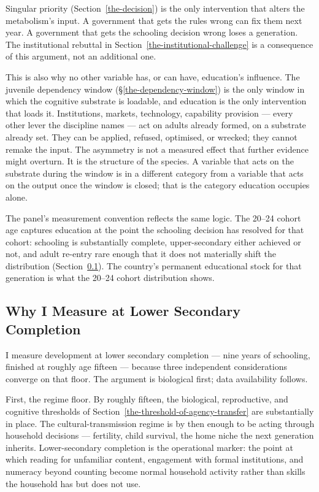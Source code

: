 \documentclass[12pt,letterpaper]{article}
\begin{document}
Singular priority (Section~\ref{the-decision}) is the only
intervention that alters the metabolism's input. A government that
gets the rules wrong can fix them next year. A government that gets
the schooling decision wrong loses a generation. The institutional
rebuttal in Section~\ref{the-institutional-challenge} is a
consequence of this argument, not an additional one.

This is also why no other variable has, or can have, education's
influence. The juvenile dependency window
(\S\ref{the-dependency-window}) is the only window in which the
cognitive substrate is loadable, and education is the only
intervention that loads it. Institutions, markets, technology,
capability provision --- every other lever the discipline names ---
act on adults already formed, on a substrate already set. They can
be applied, refused, optimised, or wrecked; they cannot remake the
input. The asymmetry is not a measured effect that further evidence
might overturn. It is the structure of the species. A variable that
acts on the substrate during the window is in a different category
from a variable that acts on the output once the window is closed;
that is the category education occupies alone.

The panel's measurement convention reflects the same logic. The
20--24 cohort age captures education at the point the schooling
decision has resolved for that cohort: schooling is substantially
complete, upper-secondary either achieved or not, and adult re-entry
rare enough that it does not materially shift the distribution
(Section~\ref{why-lower-secondary-completion}). The country's permanent
educational stock for that generation is what the 20--24 cohort
distribution shows.

\subsection{Why I Measure at Lower Secondary Completion}\label{why-lower-secondary-completion}

I measure development at lower secondary completion --- nine years
of schooling, finished at roughly age fifteen --- because three
independent considerations converge on that floor. The argument is
biological first; data availability follows.

First, the regime floor. By roughly fifteen, the biological,
reproductive, and cognitive thresholds of
Section~\ref{the-threshold-of-agency-transfer} are substantially in
place. The cultural-transmission regime is by then enough to be
acting through household decisions --- fertility, child survival,
the home niche the next generation inherits. Lower-secondary
completion is the operational marker: the point at which reading for
unfamiliar content, engagement with formal institutions, and
numeracy beyond counting become normal household activity rather
than skills the household has but does not use.
\end{document}
